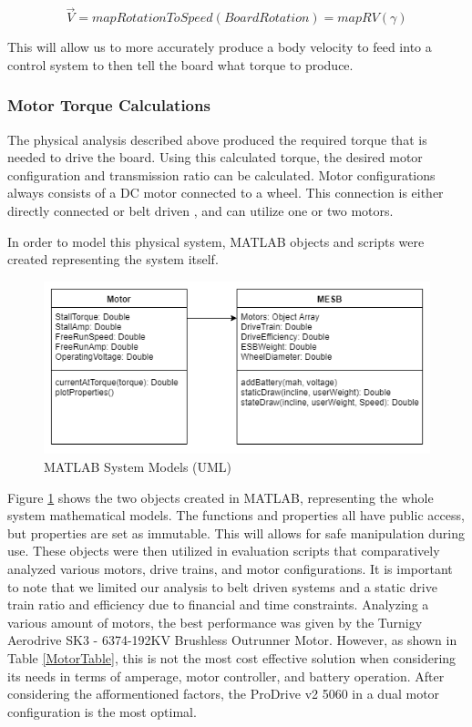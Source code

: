 \documentclass[titlepage, letterpaper,12pt]{article}
\begin{document}
\begin{equation}
    \vec{V} = mapRotationToSpeed(Board Rotation) = mapRV(\gamma)
\end{equation}

This will allow us to more accurately produce a body velocity to feed into a control system to then tell the board what torque to produce.

\subsubsection{Motor Torque Calculations}
The physical analysis described above produced the required torque that is needed to drive the board. Using this calculated torque, the desired motor configuration and transmission ratio can be calculated. Motor configurations always consists of a DC motor connected to a wheel. This connection is either directly connected \cite{DirectConnect} or belt driven \cite{BeltConnect}, and can utilize one or two motors.

In order to model this physical system, MATLAB objects and scripts were created representing the system itself.

\begin{figure}[h!]
    \centering
    \includegraphics[width=12cm]{MotorSelFigs/UML_BEST.png}
    \caption{MATLAB System Models (UML)}
    \label{MotorUML}
\end{figure}

Figure \ref{MotorUML} shows the two objects created in MATLAB, representing the whole system mathematical models. The functions and properties all have public access, but properties are set as immutable. This will allows for safe manipulation during use. These objects were then utilized in evaluation scripts that comparatively analyzed various motors, drive trains, and motor configurations. It is important to note that we limited our analysis to belt driven systems and a static drive train ratio and efficiency due to financial and time constraints. Analyzing a various amount of motors, the best performance was given by the Turnigy Aerodrive SK3 - 6374-192KV Brushless Outrunner Motor. However, as shown in Table \ref{MotorTable}, this is not the most cost effective solution when considering its needs in terms of amperage, motor controller, and battery operation. After considering the afformentioned factors, the ProDrive v2 5060 in a dual motor configuration is the most optimal.
\end{document}
